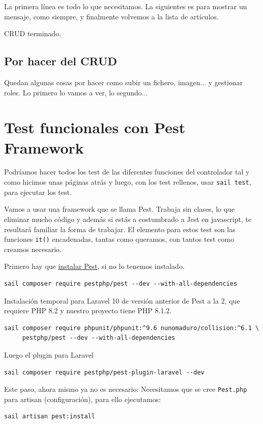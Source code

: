 \documentclass[11pt]{article}
\begin{document}
La primera línea es todo lo que necesitamos. La siguientes es para
mostrar un mensaje, como siempre, y finalmente volvemos a la lista de
artículos.

CRUD terminado.

\subsection{Por hacer del CRUD}
\label{sec:org6922acb}
Quedan algunas cosas por hacer como subir un fichero, imagen... y
gestionar roles. Lo primero lo vamos a ver, lo segundo...

\section{Test funcionales con Pest Framework}
\label{sec:org90363df}
Podríamos hacer todos los test de las diferentes funciones del
controlador tal y como hicimos unas páginas atrás y luego, con los
test rellenos, usar \texttt{sail test}, para ejecutar los test.

Vamos a usar una framework que se llama Pest. Trabaja sin clases, lo
que eliminar mucho código y además si estás a costumbrado a Jest en
javascript, te resultará familiar la forma de trabajar.  El elemento
para estos test son las funciones \texttt{it()} encadenadas, tantas como
queramos, con tantos test como creamos necesario.

Primero hay que \href{https://pestphp.com/docs/installation}{instalar Pest}, si no lo tenemos instalado.
\begin{verbatim}
sail composer require pestphp/pest --dev --with-all-dependencies
\end{verbatim}

Instalación temporal para Laravel 10 de versión anterior de Pest a la
2, que requiere PHP 8.2 y nuestro proyecto tiene PHP 8.1.2.
\begin{verbatim}
sail composer require phpunit/phpunit:^9.6 nunomaduro/collision:^6.1 \
     pestphp/pest --dev --with-all-dependencies
\end{verbatim}

Luego el plugin para Laravel
\begin{verbatim}
sail composer require pestphp/pest-plugin-laravel --dev
\end{verbatim}

Este paso, ahora mismo ya no es necesario:
Necesitamos que se cree \texttt{Pest.php} para artisan (configuración), para ello
ejecutamos:
\begin{verbatim}
sail artisan pest:install
\end{verbatim}
\end{document}
